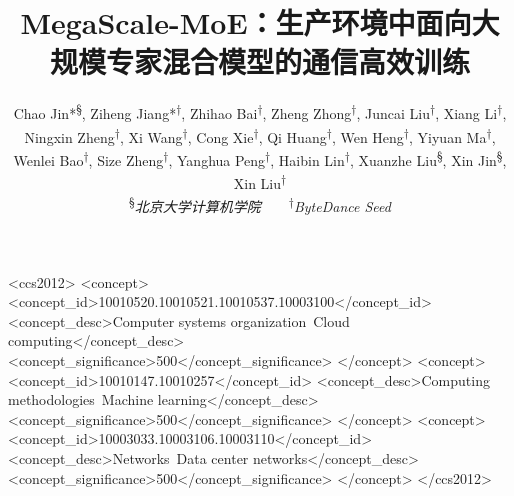 \documentclass[sigplan,twocolumn]{acmart}
\newcommand{\sysname}{MegaScale-MoE\xspace}
\begin{document}

\title{\sysname：生产环境中面向大规模专家混合模型的通信高效训练}



\newcommand*{\affmark}[1][*]{\textsuperscript{#1}}
\newcommand*{\affaddr}[1]{#1}

\author{
    Chao Jin*\affmark[\S], Ziheng Jiang*\affmark[$\dag$], Zhihao Bai\affmark[$\dag$], Zheng Zhong\affmark[$\dag$], Juncai Liu\affmark[$\dag$], Xiang Li\affmark[$\dag$], Ningxin Zheng\affmark[$\dag$], Xi Wang\affmark[$\dag$], Cong Xie\affmark[$\dag$], Qi Huang\affmark[$\dag$], Wen Heng\affmark[$\dag$], Yiyuan Ma\affmark[$\dag$], Wenlei Bao\affmark[$\dag$], Size Zheng\affmark[$\dag$], Yanghua Peng\affmark[$\dag$], Haibin Lin\affmark[$\dag$], Xuanzhe Liu\affmark[\S], Xin Jin\affmark[\S], Xin Liu\affmark[$\dag$] \\
\affaddr{\affmark[\S]{\textit{北京大学计算机学院}}}~~~~\affaddr{\affmark[$\dag$]{\textit{ByteDance Seed}}}
}

\begin{CCSXML}
<ccs2012>
   <concept>
       <concept_id>10010520.10010521.10010537.10003100</concept_id>
       <concept_desc>Computer systems organization~Cloud computing</concept_desc>
       <concept_significance>500</concept_significance>
       </concept>
   <concept>
       <concept_id>10010147.10010257</concept_id>
       <concept_desc>Computing methodologies~Machine learning</concept_desc>
       <concept_significance>500</concept_significance>
       </concept>
   <concept>
       <concept_id>10003033.10003106.10003110</concept_id>
       <concept_desc>Networks~Data center networks</concept_desc>
       <concept_significance>500</concept_significance>
       </concept>
 </ccs2012>
\end{CCSXML}


\end{document}
